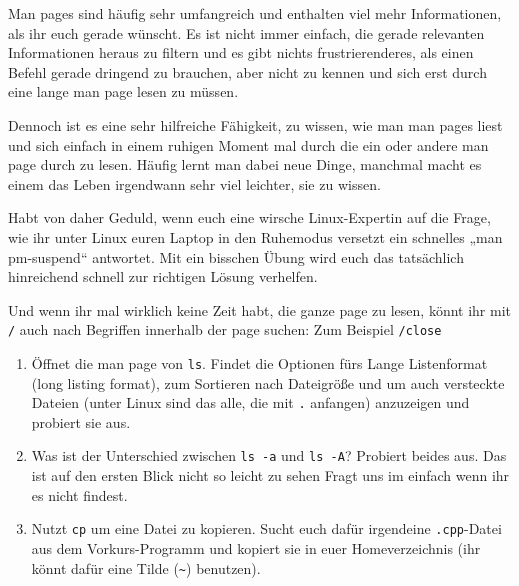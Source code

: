     Man pages sind häufig sehr umfangreich und enthalten viel mehr Informationen,
    als ihr euch gerade wünscht. Es ist nicht immer einfach, die gerade relevanten
    Informationen heraus zu filtern und es gibt nichts frustrierenderes, als einen
    Befehl gerade dringend zu brauchen, aber nicht zu kennen und sich erst durch
    eine lange man page lesen zu müssen.

    Dennoch ist es eine sehr hilfreiche Fähigkeit, zu wissen, wie man man pages
    liest und sich einfach in einem ruhigen Moment mal durch die ein oder andere
    man page durch zu lesen. Häufig lernt man dabei neue Dinge, manchmal macht es
    einem das Leben irgendwann sehr viel leichter, sie zu wissen.

    Habt von daher Geduld, wenn euch eine wirsche Linux-Expertin auf die Frage, wie
    ihr unter Linux euren Laptop in den Ruhemodus versetzt ein schnelles „man
    pm-suspend“ antwortet. Mit ein bisschen Übung wird euch das tatsächlich
    hinreichend schnell zur richtigen Lösung verhelfen.


Und wenn ihr mal wirklich keine Zeit habt, die ganze page zu lesen, könnt ihr mit \texttt{/} auch nach Begriffen innerhalb der page suchen: Zum Beispiel \texttt{/close}

\begin{praxis}
      \begin{enumerate}\addtocounter{enumi}{1}
      \item Öffnet die man page von \texttt{ls}. Findet die Optionen fürs Lange
                              Listenformat (long listing format), zum Sortieren nach Dateigröße
                              und um auch versteckte Dateien (unter Linux sind das alle, die mit
                              \texttt{.} anfangen) anzuzeigen und probiert sie aus.
      \item Was ist der Unterschied zwischen \texttt{ls -a} und \texttt{ls -A}?
            Probiert beides aus. Das ist auf den ersten Blick nicht so leicht zu sehen
                              Fragt uns im einfach wenn ihr es nicht findest.
      \item Nutzt \texttt{cp} um eine Datei zu kopieren. Sucht euch dafür
            irgendeine \texttt{.cpp}-Datei aus dem Vorkurs-Programm und kopiert sie
            in euer Homeverzeichnis (ihr könnt dafür eine Tilde (\texttt{\~})
            benutzen).
      \end{enumerate}
\end{praxis}

